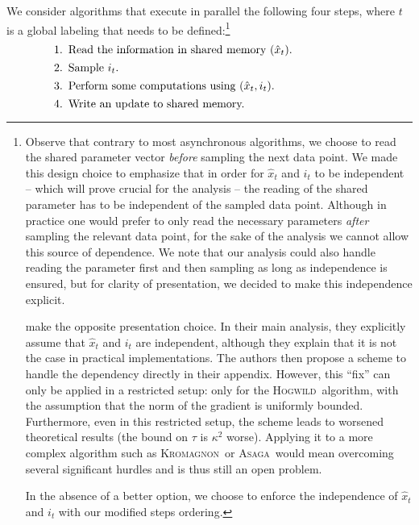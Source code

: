\documentclass[twoside, 11pt]{article}
\newcommand{\overlap}{\tau}
\newcommand{\ASAGA}{\textsc{Asaga}}
\newcommand{\Hogwild}{\textsc{Hogwild}}
\newcommand{\KROMAGNON}{\textsc{Kromagnon}}
\begin{document}
We consider algorithms that execute in parallel the following four steps, where $t$ is a global labeling that needs to be defined:\footnote{Observe that contrary to most asynchronous algorithms, we choose to read the shared parameter vector \emph{before} sampling the next data point. We made this design choice to emphasize that in order for $\hat x_t$ and $i_t$ to be independent -- which will prove crucial for the analysis -- the reading of the shared parameter has to be independent of the sampled data point. Although in practice one would prefer to only read the necessary parameters \emph{after} sampling the relevant data point, for the sake of the analysis we cannot allow this source of dependence. We note that our analysis could also handle reading the parameter first and then sampling as long as independence is ensured, but for clarity of presentation, we decided to make this independence explicit.

\citet{mania} make the opposite presentation choice. In their main analysis, they explicitly assume that $\hat x_t$ and $i_t$ are independent, although they explain that it is not the case in practical implementations. The authors then propose a scheme to handle the dependency directly in their appendix. However, this ``fix'' can only be applied in a restricted setup: only for the \Hogwild\ algorithm, with the assumption that the norm of the gradient is uniformly bounded. Furthermore, even in this restricted setup, the scheme leads to worsened theoretical results (the bound on $\overlap$ is $\kappa^2$ worse). Applying it to a more complex algorithm such as \KROMAGNON\ or \ASAGA\ would mean overcoming several significant hurdles and is thus still an open problem.

In the absence of a better option, we choose to enforce the independence of $\hat x_t$ and $i_t$ with our modified steps ordering.\label{footnote:ordering}}
\begin{equation} \label{eq:updates}
\begin{minipage}{0.9\textwidth}
\begin{enumerate}[leftmargin=3em, topsep=0mm, itemsep=0mm]
\item Read the information in shared memory ($\hat{x}_t$).
\item Sample $i_t$.
\item Perform some computations using ($\hat{x}_t, i_t$).
\item Write an update to shared memory.
\end{enumerate}
\end{minipage}
\end{equation}
\end{document}
